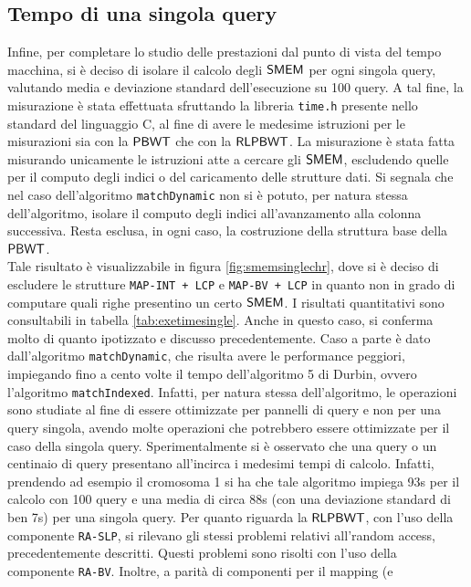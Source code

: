 \subsection{Tempo di una singola query}
Infine, per completare lo studio delle prestazioni dal punto di vista del tempo
macchina, si è deciso di 
isolare il calcolo degli $\mbox{\rm {\sf SMEM}}$ per ogni singola query, valutando media e
deviazione standard dell'esecuzione su 100 query. A tal fine, la misurazione è
stata 
effettuata sfruttando la libreria \texttt{time.h} presente nello standard del
linguaggio C, al fine di avere le medesime istruzioni per le misurazioni sia con
la $\mbox{\rm {\sf PBWT}}$ 
che con la $\mbox{\rm {\sf RLPBWT}}$. La misurazione è stata fatta misurando unicamente le
istruzioni atte a cercare gli $\mbox{\rm {\sf SMEM}}$, 
escludendo quelle per il computo degli indici o del caricamento delle strutture
dati.
Si segnala che nel caso dell'algoritmo \texttt{matchDynamic} non si è
potuto, per natura stessa dell'algoritmo, isolare il computo degli indici
all'avanzamento alla colonna successiva. Resta esclusa, in ogni caso, la
costruzione della struttura base della $\mbox{\rm {\sf PBWT}}$.
\\
Tale risultato è visualizzabile in figura
\ref{fig:smemsinglechr}, dove si è deciso di escludere le strutture
\texttt{MAP-INT + LCP} e \texttt{MAP-BV + LCP} in quanto non in grado di
computare quali righe presentino un certo $\mbox{\rm {\sf SMEM}}$. I risultati
quantitativi sono consultabili in tabella \ref{tab:exetimesingle}. Anche in
questo caso, 
si conferma molto di quanto ipotizzato e discusso precedentemente. Caso a parte
è dato dall'algoritmo \texttt{matchDynamic}, che risulta avere le performance
peggiori, impiegando fino a cento volte il tempo dell'algoritmo 5 di
Durbin, ovvero l'algoritmo \texttt{matchIndexed}. Infatti, per natura stessa
dell'algoritmo,  
le operazioni sono studiate al fine di essere ottimizzate per pannelli di query
e non per una query singola, avendo molte
operazioni che potrebbero essere ottimizzate per il caso della singola
query. Sperimentalmente si è
osservato che una query o un centinaio di query presentano all'incirca i
medesimi tempi di calcolo. Infatti, prendendo ad esempio il cromosoma 1 si ha
che tale 
algoritmo impiega 93s per il calcolo con 100 query e una media di circa 88s (con
una deviazione standard di ben 7s) per
una singola query. Per quanto riguarda la $\mbox{\rm {\sf RLPBWT}}$, con l'uso della
componente \texttt{RA-SLP}, si rilevano gli stessi problemi relativi all'random
access, precedentemente descritti. Questi problemi sono risolti con l'uso della
componente \texttt{RA-BV}. Inoltre, a parità di componenti per il mapping (e

